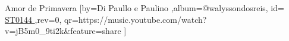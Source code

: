 \beginsong
{Amor de Primavera %
}[by={Di Paullo e Paulino %
},album={@walyssondosreis},
id={\href{https://music.youtube.com/watch?v=jB5m0_9ti2k&feature=share %
}{ ST0144 %
}},rev={0}, %
qr={https://music.youtube.com/watch?v=jB5m0_9ti2k&feature=share %
}]
\beginverse
